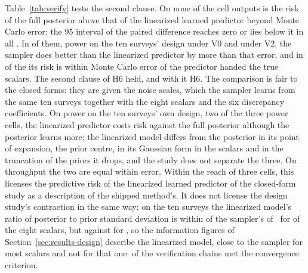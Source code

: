 Table~\ref{tab:verify} tests the second clause. On none of the \verCellOutputs{} cell outputs is the risk of the full posterior
above that of the linearized learned predictor beyond Monte Carlo error: the 95\pct{} interval of the paired difference reaches
zero or lies below it in all \verRiskHeld{}. In \verBelowKO{} of them, power on the ten surveys' design under V0 and under V2,
the sampler does better than the linearized predictor by more than that error, and in \verAtOracle{} of the \verCellOutputs{}
its risk is within Monte Carlo error of the predictor handed the true scalars. The second clause of H6 held, and with it H6.
The comparison is fair to the closed forms: they are given the noise scales, which the sampler learns from the same ten surveys
together with the eight scalars and the six discrepancy coefficients. On power on the ten surveys' own design, two of the three
power cells, the linearized predictor costs risk against the full posterior although the posterior learns more; the linearized
model differs from the posterior in its point of expansion, the prior centre, in its Gaussian form in the scalars and in the
truncation of the priors it drops, and the study does not separate the three. On throughput the two are equal within error.
Within the reach of three cells, this licenses the predictive risk of the linearized learned predictor of the closed-form study
as a description of the shipped method's. It does not license the design study's contraction in the same way: on the ten
surveys the linearized model's ratio of posterior to prior standard deviation is within \linSampMaxOther{} of the sampler's
of~\cite{cb002} for \linSampOthers{} of the eight scalars, but \linSampWorstLin{} against \linSampWorstMeas{} for
\linSampWorstName, so the information figures of Section~\ref{sec:results-design} describe the linearized model, close to the
sampler for most scalars and not for that one. \verConverged{} of the \verPosteriors{} verification chains met
the convergence criterion.

